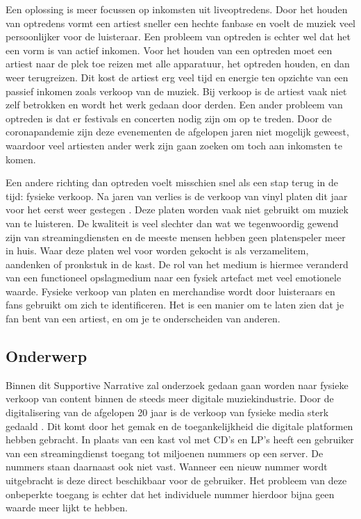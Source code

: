 Een oplossing is meer focussen op inkomsten uit liveoptredens. Door het houden van optredens vormt een artiest sneller een hechte fanbase en voelt de muziek veel persoonlijker voor de luisteraar. Een probleem van optreden is echter wel dat het een vorm is van actief inkomen. Voor het houden van een optreden moet een artiest naar de plek toe reizen met alle apparatuur, het optreden houden, en dan weer terugreizen. Dit kost de artiest erg veel tijd en energie ten opzichte van een passief inkomen zoals verkoop van de muziek. Bij verkoop is de artiest vaak niet zelf betrokken en wordt het werk gedaan door derden. Een ander probleem van optreden is dat er festivals en concerten nodig zijn om op te treden. Door de coronapandemie zijn deze evenementen de afgelopen jaren niet mogelijk geweest, waardoor veel artiesten ander werk zijn gaan zoeken om toch aan inkomsten te komen.

Een andere richting dan optreden voelt misschien snel als een stap terug in de tijd: fysieke verkoop. Na jaren van verlies is de verkoop van vinyl platen dit jaar voor het eerst weer gestegen \cite{year_end_2022_RIAA_revenue_statistics}. Deze platen worden vaak niet gebruikt om muziek van te luisteren. De kwaliteit is veel slechter dan wat we tegenwoordig gewend zijn van streamingdiensten en de meeste mensen hebben geen platenspeler meer in huis. Waar deze platen wel voor worden gekocht is als verzamelitem, aandenken of pronkstuk in de kast. De rol van het medium is hiermee veranderd van een functioneel opslagmedium naar een fysiek artefact met veel emotionele waarde. Fysieke verkoop van platen en merchandise wordt door luisteraars en fans gebruikt om zich te identificeren. Het is een manier om te laten zien dat je fan bent van een artiest, en om je te onderscheiden van anderen.

\subsection{Onderwerp}
Binnen dit Supportive Narrative zal onderzoek gedaan gaan worden naar fysieke verkoop van content binnen de steeds meer digitale muziekindustrie. Door de digitalisering van de afgelopen 20 jaar is de verkoop van fysieke media sterk gedaald \cite{dong2022valueofmusic}. Dit komt door het gemak en de toegankelijkheid die digitale platformen hebben gebracht. In plaats van een kast vol met CD's en LP's heeft een gebruiker van een streamingdienst toegang tot miljoenen nummers op een server. De nummers staan daarnaast ook niet vast. Wanneer een nieuw nummer wordt uitgebracht is deze direct beschikbaar voor de gebruiker. Het probleem van deze onbeperkte toegang is echter dat het individuele nummer hierdoor bijna geen waarde meer lijkt te hebben.

